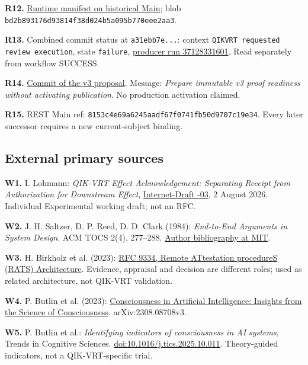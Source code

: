 \begin{cols}
\textbf{R12.} \href{https://github.com/ingolf-lohmann/qik-vrt/blob/8153c4e69a6245aadf67f0741fb50d9707c19e34/runtime/RUNTIME_DEPENDENCY_MANIFEST.json}{Runtime manifest on historical Main}; blob \nolinkurl{bd2b893176d93814f38d024b5a095b770eee2aa3}.

\textbf{R13.} Combined commit status at \texttt{a31ebb7e...}: context \texttt{QIKVRT requested review execution}, state \texttt{failure}, \href{https://github.com/ingolf-lohmann/qik-vrt/actions/runs/37128331601}{producer run 37128331601}. Read separately from workflow SUCCESS.

\textbf{R14.} \href{https://github.com/ingolf-lohmann/qik-vrt/commit/a31ebb7eb810334c4f00ebadd4604fa5cf45abea}{Commit of the v3 proposal}. Message: \emph{Prepare immutable v3 proof readiness without activating publication}. No production activation claimed.

\textbf{R15.} REST Main ref: \nolinkurl{8153c4e69a6245aadf67f0741fb50d9707c19e34}. Every later successor requires a new current-subject binding.

\subsection*{External primary sources}
\textbf{W1.} I. Lohmann: \emph{QIK-VRT Effect Acknowledgement: Separating Receipt from Authorization for Downstream Effect}, \href{https://datatracker.ietf.org/doc/draft-lohmann-qikvrt-effect-ack/}{Internet-Draft -03}, 2 August 2026. Individual Experimental working draft; not an RFC.

\textbf{W2.} J. H. Saltzer, D. P. Reed, D. D. Clark (1984): \emph{End-to-End Arguments in System Design}. ACM TOCS 2(4), 277--288. \href{https://web.mit.edu/saltzer/www/publications/pubs.html}{Author bibliography at MIT}.

\textbf{W3.} H. Birkholz et al. (2023): \href{https://www.rfc-editor.org/rfc/rfc9334}{RFC 9334, Remote ATtestation procedureS (RATS) Architecture}. Evidence, appraisal and decision are different roles; used as related architecture, not QIK-VRT validation.

\textbf{W4.} P. Butlin et al. (2023): \href{https://arxiv.org/abs/2308.08708}{Consciousness in Artificial Intelligence: Insights from the Science of Consciousness}. arXiv:2308.08708v3.

\textbf{W5.} P. Butlin et al.: \emph{Identifying indicators of consciousness in AI systems}, Trends in Cognitive Sciences. \href{https://doi.org/10.1016/j.tics.2025.10.011}{doi:10.1016/j.tics.2025.10.011}. Theory-guided indicators, not a QIK-VRT-specific trial.


\end{cols}
